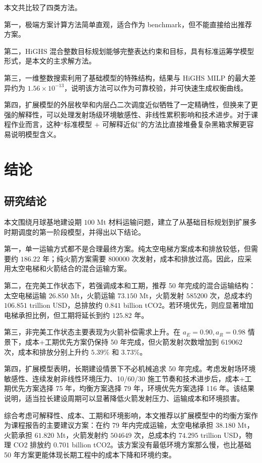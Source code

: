 \documentclass[12pt,a4paper,UTF8]{article}
\begin{document}
本文共比较了四类方法。

第一，极端方案计算方法简单直观，适合作为 benchmark，但不能直接给出推荐方案。

第二，HiGHS 混合整数目标规划能够完整表达约束和目标，具有标准运筹学模型形式，是本文的主求解方法。

第三，一维整数搜索利用了基础模型的特殊结构，结果与 HiGHS MILP 的最大差异约为 \(1.56\times10^{-13}\)，说明该方法可以作为可靠校验，并可快速生成权衡曲线。

第四，扩展模型的外层枚举和内层凸二次调度近似牺牲了一定精确性，但换来了更强的解释性，可以处理发射场级环境敏感性、非线性累积影响和技术进步。对于课程作业而言，这种“标准模型 + 可解释近似”的方法比直接堆叠复杂黑箱求解更容易说明模型含义。

\clearpage
\section{结论}

\subsection{研究结论}

本文围绕月球基地建设期 \(100\) Mt 材料运输问题，建立了从基础目标规划到扩展多时期调度的第一阶段模型，并得出以下结论。

第一，单一运输方式都不是合理最终方案。纯太空电梯方案成本和排放较低，但需要约 \(186.22\) 年；纯火箭方案需要 \(800000\) 次发射，成本和排放过高。因此，应采用太空电梯和火箭结合的混合运输方案。

第二，在完美工作状态下，若强调成本和工期，推荐 50 年完成的混合运输结构：太空电梯运输 \(26.850\) Mt，火箭运输 \(73.150\) Mt，火箭发射 \(585200\) 次，总成本约 \(106.851\) trillion USD，总排放约 \(0.841\) billion tCO2。若环境优先，则应显著增加电梯承担比例，但工期将延长到约 \(125.82\) 年。

第三，非完美工作状态主要表现为火箭补偿需求上升。在 \(a_E=0.90,a_R=0.98\) 情景下，成本+工期优先方案仍保持 50 年完成，但火箭发射次数增加到 \(619062\) 次，成本和排放分别上升约 \(5.39\%\) 和 \(3.73\%\)。

第四，扩展模型表明，长期建设情景下不必机械追求 50 年完成。考虑发射场环境敏感性、连续发射非线性环境压力、10/60/30 施工节奏和技术进步后，成本+工期优先方案选择 75 年，均衡方案选择 79 年，环境优先方案选择 116 年。该结果说明，适当拉长建设周期可以显著降低火箭发射压力、运输成本和环境损害。

综合考虑可解释性、成本、工期和环境影响，本文推荐以扩展模型中的均衡方案作为课程报告的主要建议方案：在约 79 年内完成运输，太空电梯承担 \(38.180\) Mt，火箭承担 \(61.820\) Mt，火箭发射约 \(504649\) 次，总成本约 \(74.295\) trillion USD，物理 CO2 排放约 \(0.701\) billion tCO2。该方案没有最低环境方案那么慢，也比基础 50 年方案更能体现长期工程中的成本下降和环境约束。
\end{document}
